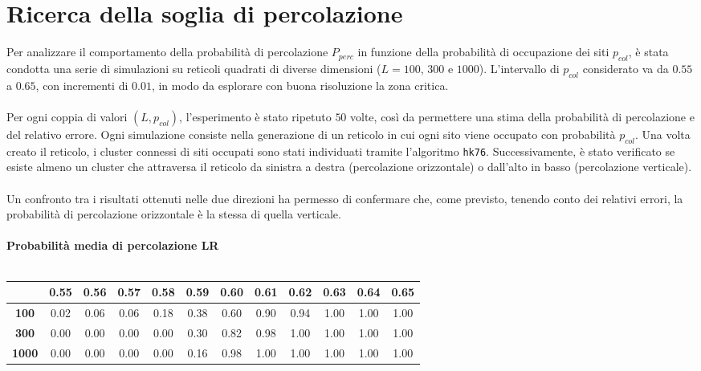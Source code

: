 \section{Ricerca della soglia di percolazione}
Per analizzare il comportamento della probabilità di percolazione $P_{perc}$ in funzione della probabilità di occupazione dei siti $p_{col}$, è stata condotta una serie di simulazioni su reticoli quadrati di diverse dimensioni ($L = 100$, $300$ e $1000$). L’intervallo di $p_{col}$ considerato va da $0.55$ a $0.65$, con incrementi di $0.01$, in modo da esplorare con buona risoluzione la zona critica.
\\\\
\noindent
Per ogni coppia di valori $(L, p_{col})$, l’esperimento è stato ripetuto $50$ volte, così da permettere una stima della probabilità di percolazione e del relativo errore. Ogni simulazione consiste nella generazione di un reticolo in cui ogni sito viene occupato con probabilità $p_{col}$. Una volta creato il reticolo, i cluster connessi di siti occupati sono stati individuati tramite l'algoritmo \texttt{hk76}. Successivamente, è stato verificato se esiste almeno un cluster che attraversa il reticolo da sinistra a destra (percolazione orizzontale) o dall’alto in basso (percolazione verticale).
\\\\
\noindent
Un confronto tra i risultati ottenuti nelle due direzioni ha permesso di confermare che, come previsto, tenendo conto dei relativi errori, la probabilità di percolazione orizzontale è la stessa di quella verticale.
\\\\
\textbf{Probabilità media di percolazione LR}
\\\\
\noindent
\begin{tabular}{|c|*{11}{c|}}
	\hline
	\textbf{}&\textbf{0.55} &	\textbf{0.56}& \textbf{0.57} &	\textbf{0.58}	& \textbf{0.59}& 	\textbf{0.60}&	\textbf{0.61}&\textbf{	0.62}&	\textbf{0.63}& \textbf{0.64} &\textbf{0.65}	\\
	\hline
	
	\textbf{100} &0.02 &	0.06& 0.06 &	0.18	& 0.38& 	0.60&	0.90&	0.94&	1.00 &	1.00 &	1.00\\
	\hline

	\textbf{300} & 0.00	& 0.00	& 0.00&	0.00&	0.30 & 0.82 &	0.98&	1.00&1.00&1.00&1.00\\
	\hline
	\textbf{1000}& 0.00&	0.00	&0.00	&0.00	&0.16&	0.98&	1.00&	1.00 & 1.00 & 1.00 & 1.00\\
	\hline
\end{tabular}
\vspace{15px}

